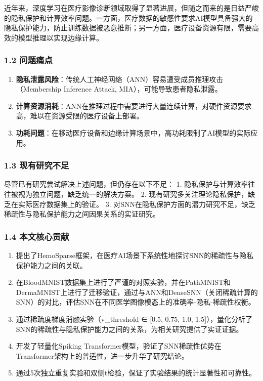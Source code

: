 \documentclass[
]{article}
\providecommand{\tightlist}{%
  \setlength{\itemsep}{0pt}\setlength{\parskip}{0pt}}
\begin{document}
近年来，深度学习在医疗影像诊断领域取得了显著进展，但随之而来的是日益严峻的隐私保护和计算效率问题。一方面，医疗数据的敏感性要求AI模型具备强大的隐私保护能力，防止训练数据被恶意推断；另一方面，医疗设备资源有限，需要高效的模型推理以实现边缘计算。

\subsubsection{1.2 问题痛点}\label{ux95eeux9898ux75dbux70b9}

\begin{enumerate}
\def\labelenumi{\arabic{enumi}.}
\tightlist
\item
  \textbf{隐私泄露风险}：传统人工神经网络（ANN）容易遭受成员推理攻击（Membership
  Inference Attack, MIA），可能导致患者隐私泄露。
\item
  \textbf{计算资源消耗}：ANN在推理过程中需要进行大量连续计算，对硬件资源要求高，难以在资源受限的医疗设备上部署。
\item
  \textbf{功耗问题}：在移动医疗设备和边缘计算场景中，高功耗限制了AI模型的实际应用。
\end{enumerate}

\subsubsection{1.3
现有研究不足}\label{ux73b0ux6709ux7814ux7a76ux4e0dux8db3}

尽管已有研究尝试解决上述问题，但仍存在以下不足： 1.
隐私保护与计算效率往往被视为独立问题，缺乏统一的解决方案。 2.
现有研究多关注理论隐私保护，缺乏在实际医疗数据集上的验证。 3.
对SNN在隐私保护方面的潜力研究不足，缺乏稀疏性与隐私保护能力之间因果关系的实证研究。

\subsubsection{1.4
本文核心贡献}\label{ux672cux6587ux6838ux5fc3ux8d21ux732e}

\begin{enumerate}
\def\labelenumi{\arabic{enumi}.}
\tightlist
\item
  提出了HemoSparse框架，在医疗AI场景下系统性地探讨SNN的稀疏性与隐私保护能力之间的关联。
\item
  在BloodMNIST数据集上进行了严谨的对照实验，并在PathMNIST和DermaMNIST上进行了迁移验证，通过与ANN和DenseSNN（关闭稀疏计算的SNN）的对比，评估SNN在不同医学图像模态上的准确率-隐私-稀疏性权衡。
\item
  通过稀疏度梯度消融实验（v\_threshold ∈ {[}0.5, 0.75, 1.0,
  1.5{]}），量化分析了SNN的稀疏性与隐私保护能力之间的关系，为相关研究提供了实证证据。
\item
  开发了轻量化Spiking
  Transformer模型，验证了SNN稀疏性优势在Transformer架构上的普适性，进一步升华了研究结论。
\item
  通过5次独立重复实验和双侧t检验，保证了实验结果的统计显著性和可靠性。
\end{enumerate}
\end{document}
